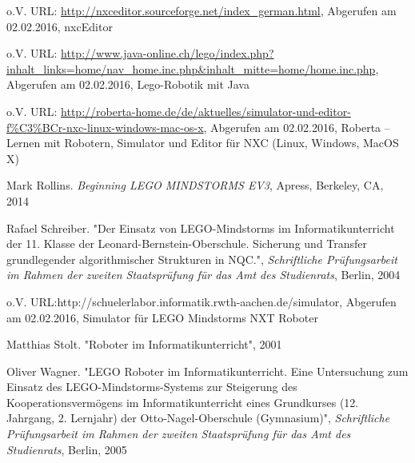 \begin{thebibliography}{ABCDEF}
o.V. URL: \url{http://nxceditor.sourceforge.net/index_german.html}, Abgerufen am 02.02.2016, nxcEditor

o.V. URL: \url{http://www.java-online.ch/lego/index.php?inhalt_links=home/nav_home.inc.php&inhalt_mitte=home/home.inc.php}, Abgerufen am 02.02.2016, Lego-Robotik mit Java 

o.V. URL: \url{http://roberta-home.de/de/aktuelles/simulator-und-editor-f%C3%BCr-nxc-linux-windows-mac-os-x}, Abgerufen am 02.02.2016, Roberta -- Lernen mit Robotern, Simulator und Editor für NXC (Linux, Windows, MacOS X)

Mark Rollins. \emph{Beginning LEGO MINDSTORMS EV3}, Apress, Berkeley, CA, 2014

Rafael Schreiber. "Der Einsatz von LEGO-Mindstorms im Informatikunterricht der 11. Klasse der Leonard-Bernstein-Oberschule. Sicherung und Transfer grundlegender algorithmischer Strukturen in NQC.", \emph{Schriftliche Prüfungsarbeit im Rahmen der zweiten Staatsprüfung für das Amt des Studienrats}, Berlin, 2004

o.V. URL:{http://schuelerlabor.informatik.rwth-aachen.de/simulator}, Abgerufen am 02.02.2016, Simulator für LEGO Mindstorms NXT Roboter

Matthias Stolt. "Roboter im Informatikunterricht", 2001

Oliver Wagner. "LEGO Roboter im Informatikunterricht. Eine Untersuchung zum Einsatz des LEGO-Mindstorms-Systems zur Steigerung des Kooperationsvermögens im Informatikunterricht eines Grundkurses (12. Jahrgang, 2. Lernjahr) der Otto-Nagel-Oberschule (Gymnasium)", \emph{Schriftliche Prüfungsarbeit im Rahmen der zweiten Staatsprüfung für das Amt des Studienrats}, Berlin, 2005

\end{thebibliography}